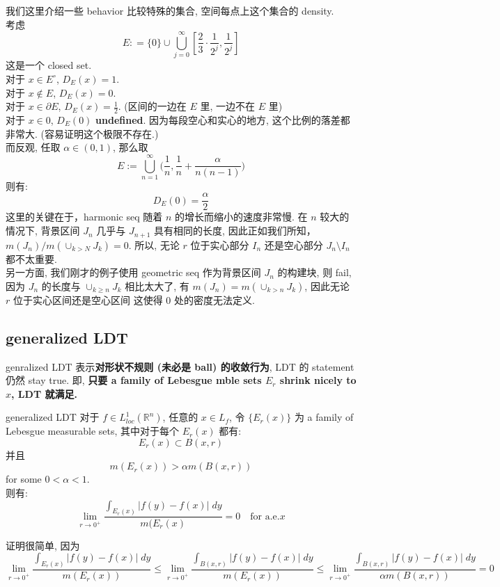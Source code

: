 \documentclass[lang=cn,11pt]{elegantbook}
\begin{document}
\begin{example}
    我们这里介绍一些 behavior 比较特殊的集合, 空间每点上这个集合的 density.\\
    考虑 \[
    E : = \{0\} \cup \bigcup_{j=0}^\infty [\frac{2}{3} \cdot \frac{1}{2^j}, \frac{1}{2^j}]
    \]
    这是一个 closed set.\\
    对于 $x\in E^\circ$, $D_E(x)=1$.\\
    对于 $x \not\in E$, $D_E(x)=0$.\\
    对于 $x \in \partial E$, $D_E(x)=\frac{1}{2}$. (区间的一边在 $E$ 里,  一边不在 $E$ 里)\\
    对于 $x \in 0$, $D_E(0)$ \textbf{undefined}. 因为每段空心和实心的地方, 这个比例的落差都非常大. (容易证明这个极限不存在.)\\
    而反观, 任取 $\alpha \in (0,1)$, 那么取 \[
E := \bigcup_{n=1}^{\infty}
\bigr( \frac{1}{n},
 \frac{1}{n}+ \frac{\alpha}{n(n-1)}\bigr)
\] 则有: \[
D_E(0) = \frac{\alpha}{2}
\]
这里的关键在于，harmonic seq 随着 $n$ 的增长而缩小的速度非常慢. 在 $n$ 较大的情况下, 背景区间 $J_n$ 几乎与 $J_{n+1}$ 具有相同的长度, 因此正如我们所知，$m(J_n) / m(\cup_{k> N}J_k) = 0$. 所以, 无论 $r$ 位于实心部分 $I_n$ 还是空心部分 $J_n \setminus I_n$ 都不太重要.\\
另一方面, 我们刚才的例子使用 geometric seq 作为背景区间 $J_n$ 的构建块, 则 fail, 因为 $J_n$ 的长度与 $\cup_{k\geq n} J_k$ 相比太大了, 有 $m(J_n) = m(\cup_{k> n} J_k)$, 因此无论 $r$ 位于实心区间还是空心区间 这使得 $0$ 处的密度无法定义.
\end{example}


\subsection{generalized LDT}
genralized LDT 表示\textbf{对形状不规则 (未必是 ball) 的收敛行为}, LDT 的 statement 仍然 stay true. 即, \textbf{只要 a family of Lebesgue mble sets $E_r$ shrink nicely to $x$, LDT 就满足. }
\begin{theorem}{generalized LDT}
    对于 $f\in L^1_{loc}(\mathbb{R}^n)$, 任意的 $x\in L_f$, 令 $\{E_r(x)\}$ 为 a family of Lebesgue measurable sets, 其中对于每个 $E_r(x)$ 都有: \[
    E_r(x) \subset B(x,r)
    \]
    并且 \[
    m(E_r(x)) > \alpha m(B(x,r))
    \] for some $0<\alpha < 1$.\\
    则有:  \[
    \lim_{r\to 0^+} \frac{\int_{E_r(x)} |f(y)-f(x)| \; dy }{m(E_r(x)} =0\quad \text{for a.e.} x
    \]
\end{theorem}
证明很简单, 因为\[
  \lim_{r\to 0^+} \frac{\int_{E_r(x)} |f(y)-f(x)| \; dy }{m(E_r(x))} \leq   \lim_{r\to 0^+} \frac{\int_{B(x,r)} |f(y)-f(x)| \; dy }{m(E_r(x))} \leq   \lim_{r\to 0^+} \frac{\int_{B(x,r)} |f(y)-f(x)| \; dy }{\alpha m(B(x,r))} =0
\]
\end{document}
